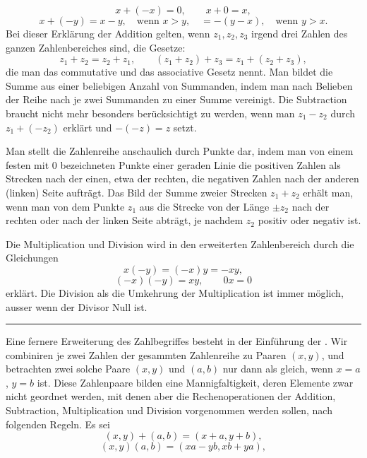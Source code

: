 \[
 x+(-x)=0,
 \qquad x+0=x,
\]
\[
 x+(-y)=x-y,\quad \text{wenn }x>y,
 \quad =-(y-x),\quad \text{wenn }y>x.
\]
Bei dieser Erklärung der Addition gelten, wenn $z_1,z_2,z_3$ irgend
drei Zahlen des ganzen Zahlenbereiches sind, die Gesetze:
\[
 z_1+z_2=z_2+z_1,
 \qquad (z_1+z_2)+z_3=z_1+(z_2+z_3),
\]
die man das commutative und das associative Gesetz nennt. Man bildet
die Summe aus einer beliebigen Anzahl von Summanden, indem man nach
Belieben der Reihe nach je zwei Summanden zu einer Summe vereinigt. Die
Subtraction braucht nicht mehr besonders berücksichtigt zu werden,
wenn man $z_1-z_2$ durch $z_1+(-z_2)$ erklärt und $-(-z)=z$ setzt.

Man stellt die Zahlenreihe anschaulich durch Punkte dar, indem man von
einem festen mit $0$ bezeichneten Punkte einer geraden Linie die
positiven Zahlen als Strecken nach der einen, etwa der rechten, die
negativen Zahlen nach der anderen (linken) Seite aufträgt. Das Bild der
Summe zweier Strecken $z_1+z_2$ erhält man, wenn man von dem Punkte
$z_1$ aus die Strecke von der Länge $\pm z_2$ nach der rechten oder
nach der linken Seite abträgt, je nachdem $z_2$ positiv oder negativ
ist.

Die Multiplication und Division wird in den erweiterten Zahlenbereich
durch die Gleichungen
\[
 x(-y)=(-x)y=-xy,
\]
\[
 (-x)(-y)=xy,
 \qquad 0x=0
\]
erklärt. Die Division als die Umkehrung der Multiplication ist immer
möglich, ausser wenn der Divisor Null ist.

\begin{center}
\rule{0.18\linewidth}{0.4pt}
\end{center}

Eine fernere Erweiterung des Zahlbegriffes besteht in der Einführung
der . Wir combiniren je zwei Zahlen der
gesammten Zahlenreihe zu Paaren $(x,y)$, und betrachten zwei solche
Paare $(x,y)$ und $(a,b)$ nur dann als gleich, wenn $x=a$, $y=b$ ist.
Diese Zahlenpaare bilden eine Mannigfaltigkeit, deren Elemente zwar
nicht geordnet werden, mit denen aber die Rechenoperationen der
Addition, Subtraction, Multiplication und Division vorgenommen werden
sollen, nach folgenden Regeln. Es sei
\[
 (x,y)+(a,b)=(x+a,y+b),
\]
\[
 (x,y)(a,b)=(xa-yb,xb+ya),
\]
